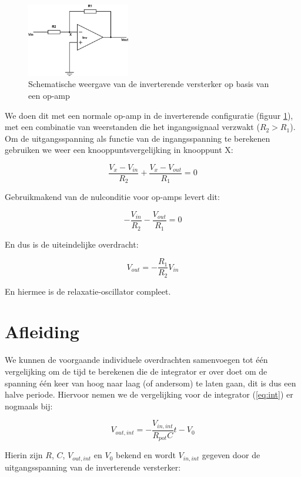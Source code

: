 \documentclass{report}
\begin{document}
\begin{figure}
	\centering
	\includegraphics[width=0.4\textwidth]{inverterende-versterker.png}
	\caption{Schematische weergave van de inverterende versterker op basis van een op-amp}
	\label{fig:inv-ver}
\end{figure}

We doen dit met een normale op-amp in de inverterende configuratie (figuur \ref{fig:inv-ver}), met een combinatie van weerstanden die het ingangssignaal verzwakt ($R_{2}>R_{1}$). Om de uitgangsspanning als functie van de ingangsspanning te berekenen gebruiken we weer een knooppuntsvergelijking in knooppunt X:

$$\frac{V_{x}-V_{in}}{R_{2}} +\frac{V_{x}-V_{out}}{R_{1}} = 0$$

\noindent
Gebruikmakend van de nulconditie voor op-amps levert dit:

$$-\frac{V_{in}}{R_{2}} - \frac{V_{out}}{R_{1}} = 0$$

\noindent
En dus is de uiteindelijke overdracht:

\begin{equation}
	V_{out} = -\frac{R_{1}}{R_{2}}V_{in}
	\label{eq:inv-ver}
\end{equation}

\noindent
En hiermee is de relaxatie-oscillator compleet. 

\section{Afleiding}

We kunnen de voorgaande individuele overdrachten samenvoegen tot één vergelijking om de tijd te berekenen die de integrator er over doet om de spanning één keer van hoog naar laag (of andersom) te laten gaan, dit is dus een halve periode. Hiervoor nemen we de vergelijking voor de integrator (\ref{eq:int}) er nogmaals bij:

$$V_{out,int} = -\frac{V_{in,int}}{R_{pot}C} t - V_{0}$$

\noindent
Hierin zijn $R$, $C$, $V_{out,int}$ en $V_{0}$ bekend en wordt $V_{in,int}$ gegeven door de uitgangsspanning van de inverterende versterker:
\end{document}
